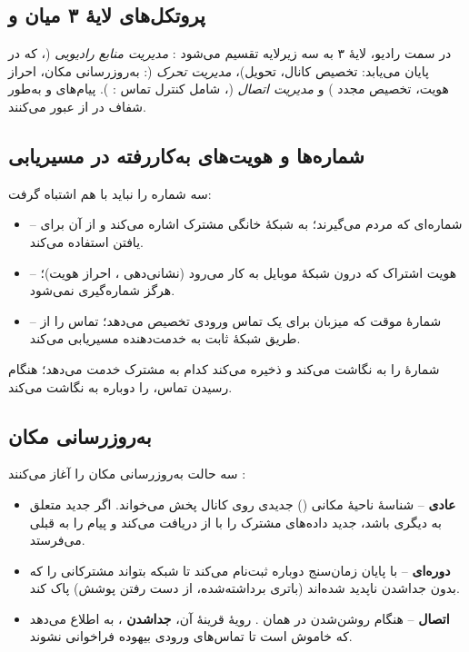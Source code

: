 \documentclass[11pt,a4paper]{article}
\begin{document}
\subsection{پروتکل‌های لایهٔ ۳ میان  و }
در سمت رادیو، لایهٔ ۳ به سه زیرلایه تقسیم می‌شود \cite{ts24008}: \emph{مدیریت منابع رادیویی}
(، که در  پایان می‌یابد: تخصیص کانال، تحویل)، \emph{مدیریت تحرک}
(: به‌روزرسانی مکان، احراز هویت، تخصیص مجدد ) و \emph{مدیریت اتصال}
(، شامل کنترل تماس : ). پیام‌های
 و  به‌طور شفاف در  از  عبور می‌کنند.

\subsection{شماره‌ها و هویت‌های به‌کاررفته در مسیریابی}
سه شماره را نباید با هم اشتباه گرفت:
\begin{itemize}
  \item \textbf{} -- شماره‌ای که مردم می‌گیرند؛ به شبکهٔ خانگی مشترک اشاره
        می‌کند و  از آن برای یافتن  استفاده می‌کند.
  \item \textbf{} -- هویت اشتراک که درون شبکهٔ موبایل به کار می‌رود (نشانی‌دهی
        ، احراز هویت)؛ هرگز شماره‌گیری نمی‌شود.
  \item \textbf{} -- شمارهٔ موقت  که  میزبان برای یک تماس ورودی
        تخصیص می‌دهد؛ تماس را از طریق شبکهٔ ثابت به  خدمت‌دهنده مسیریابی می‌کند.
\end{itemize}
 شمارهٔ  را به  نگاشت می‌کند و ذخیره می‌کند کدام  به
مشترک خدمت می‌دهد؛  هنگام رسیدن تماس،  را دوباره به  نگاشت می‌کند.

\subsection{به‌روزرسانی مکان}
سه حالت به‌روزرسانی مکان را آغاز می‌کنند \cite{ts23012}:
\begin{itemize}
  \item \textbf{عادی} --  شناسهٔ ناحیهٔ مکانی () جدیدی روی کانال پخش می‌خواند.
        اگر  جدید متعلق به  دیگری باشد،  جدید داده‌های مشترک را با
         از  دریافت می‌کند و  پیام  را
        به  قبلی می‌فرستد.
  \item \textbf{دوره‌ای} --  با پایان زمان‌سنج  دوباره ثبت‌نام می‌کند تا شبکه
        بتواند مشترکانی را که بدون جداشدن ناپدید شده‌اند (باتری برداشته‌شده، از دست رفتن پوشش)
        پاک کند.
  \item \textbf{اتصال } -- هنگام روشن‌شدن در همان . رویهٔ قرینهٔ آن،
        \textbf{جداشدن }، به  اطلاع می‌دهد که  خاموش است تا تماس‌های
        ورودی بیهوده فراخوانی نشوند.
\end{itemize}
\end{document}
